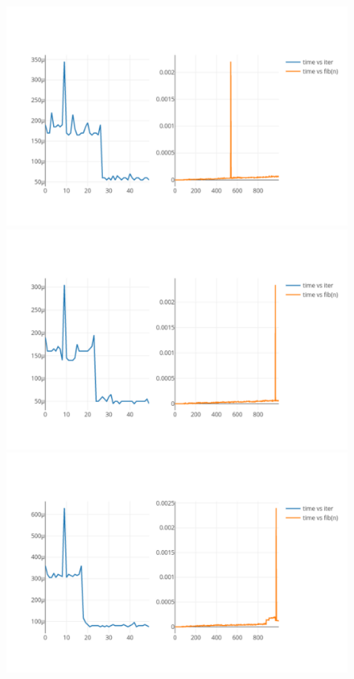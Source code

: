 \documentclass[onecolumn]{preport}
\begin{document}
\begin{figure}[H]
\begin{center}
\begin{minipage}{0.23\columnwidth}
      \subcaption{}
    \end{minipage}
    \begin{minipage}{0.23\columnwidth}   
      \includegraphics[width=\columnwidth]{figs/newplot4.pdf}
      \subcaption{}
    \end{minipage}
    \begin{minipage}{0.23\columnwidth}   
      \includegraphics[width=\columnwidth]{figs/newplot5.pdf}
      \subcaption{}
    \end{minipage}
    \begin{minipage}{0.23\columnwidth}   
      \includegraphics[width=\columnwidth]{figs/newplot6.pdf}

\end{minipage}
\end{center}
\end{figure}
\end{document}
